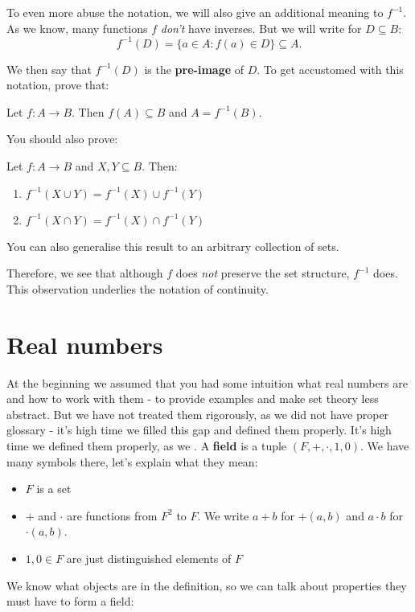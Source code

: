 \noindent To even more abuse the notation, we will also give an additional meaning to $f^{-1}$. As we know, many functions $f$ \textit{don't} have inverses. But we will write for $D\subseteq B$:
$$f^{-1}(D) = \{a \in A : f(a)\in D\}\subseteq A.$$

We then say that $f^{-1}(D)$ is the \textbf{pre-image} of $D$.
To get accustomed with this notation, prove that:

\begin{prob}
  Let $f:A\to B$. Then $f(A)\subseteq B$ and $A=f^{-1}(B)$.
\end{prob}

You should also prove:
\begin{prob}
  Let $f:A\to B$ and $X,Y\subseteq B$. Then:
  \begin{enumerate}
    \item $f^{-1}(X\cup Y)=f^{-1}(X)\cup f^{-1}(Y)$
    \item $f^{-1}(X\cap Y)=f^{-1}(X)\cap f^{-1}(Y)$
  \end{enumerate}
  You can also generalise this result to an arbitrary collection of
  sets.
\end{prob}
Therefore, we see that although $f$ does \textit{not} preserve the
set structure, $f^{-1}$ does. This observation underlies the
notation of continuity.

\section{Real numbers}
At the beginning we assumed that you had some intuition what real numbers
are and how to work with them - to provide examples and make set theory less
abstract. But we have not treated them rigorously, as we did not have proper
glossary - it's high time we filled this gap and defined them properly.
It's high time we defined them properly, as we .
A \textbf{field} is a tuple $(F, +, \cdot, 1, 0).$ We have
many symbols there, let's explain what they mean:
\begin{itemize}
  \item $F$ is a set
  \item $+$ and $\cdot$ are functions from $F^2$ to $F$. We write
    $a+b$ for $+(a,b)$ and $a\cdot b$ for $\cdot (a,b)$.
  \item $1, 0\in F$ are just distinguished elements of $F$
\end{itemize}
We know what objects are in the definition, so we can talk about
properties they must have to form a field:

